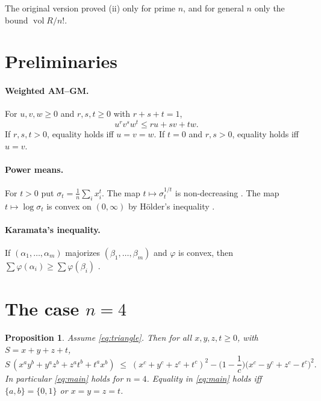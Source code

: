 \documentclass[11pt]{article}
\newtheorem{proposition}[theorem]{Proposition}
\theoremstyle{remark}
\numberwithin{equation}{section}
\begin{document}
The original version proved (ii) only for prime $n$, and for general $n$ only the bound
$\operatorname{vol}R/n!$.

\section{Preliminaries}

\paragraph{Weighted AM--GM.} For $u,v,w\ge0$ and $r,s,t\ge0$ with $r+s+t=1$,
\begin{equation}\label{eq:amgm}
u^rv^sw^t\le ru+sv+tw.
\end{equation}
If $r,s,t>0$, equality holds iff $u=v=w$. If $t=0$ and $r,s>0$, equality holds iff $u=v$.

\paragraph{Power means.} For $t>0$ put $\sigma_t=\frac1n\sum_i x_i^t$. The map $t\mapsto\sigma_t^{1/t}$
is non-decreasing \cite[Thm.~16]{HLP}. The map $t\mapsto\log\sigma_t$ is convex on
$(0,\infty)$ by H\"older's inequality \cite{HLP}.

\paragraph{Karamata's inequality.} If $(\alpha_1,\dots,\alpha_m)$ majorizes
$(\beta_1,\dots,\beta_m)$ and $\varphi$ is convex, then
$\sum\varphi(\alpha_i)\ge\sum\varphi(\beta_i)$ \cite{MOA}.

\section{The case $n=4$}

\begin{proposition}\label{prop:n4}
Assume \eqref{eq:triangle}. Then for all $x,y,z,t\ge0$, with $S=x+y+z+t$,
\begin{equation}\label{eq:n4}
S\,(x^ay^b+y^az^b+z^at^b+t^ax^b)\;\le\;(x^c+y^c+z^c+t^c)^2-\Big(1-\frac1c\Big)\big(x^c-y^c+z^c-t^c\big)^2.
\end{equation}
In particular \eqref{eq:main} holds for $n=4$. Equality in \eqref{eq:main} holds iff
$\{a,b\}=\{0,1\}$ or $x=y=z=t$.
\end{proposition}
\end{document}
